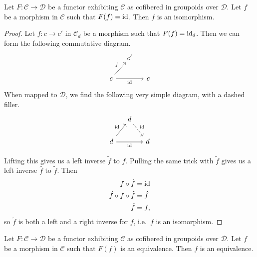 \documentclass[main.tex]{subfiles}
\begin{document}
\begin{lemma}
  \label{lemma:cofibered_in_groupoids_morphism_mapped_to_identity_is_isomorphism}
  Let $F\colon \mathcal{C} \to \mathcal{D}$ be a functor exhibiting $\mathcal{C}$ as cofibered in groupoids over $\mathcal{D}$. Let $f$ be a morphism in $\mathcal{C}$ such that $F(f) = \mathrm{id}$. Then $f$ is an isomorphism.
\end{lemma}
\begin{proof}
  Let $f\colon c \to c'$ in $\mathcal{C}_{d}$ be a morphism such that $F(f) = \mathrm{id}_{d}$. Then we can form the following commutative diagram.
  \begin{equation*}
    \begin{tikzcd}[column sep=small]
      & c'
      \\
      c
      \arrow[ur, "f"]
      \arrow[rr, swap, "\id"]
      & & c
    \end{tikzcd}
  \end{equation*}
  When mapped to $\mathcal{D}$, we find the following very simple diagram, with a dashed filler.
  \begin{equation*}
    \begin{tikzcd}[column sep=small]
      & d
      \arrow[dr, dashed, "\id"]
      \\
      d
      \arrow[ur, "\id"]
      \arrow[rr, swap, "\id"]
      && d
    \end{tikzcd}
  \end{equation*}

  Lifting this gives us a left inverse $\tilde{f}$ to $f$. Pulling the same trick with $\tilde{f}$ gives us a left inverse $\hat{f}$ to $\tilde{f}$. Then
  \begin{align*}
    f \circ \tilde{f} &= \mathrm{id} \\
    \hat{f} \circ f \circ \tilde{f} &= \hat{f} \\
    \hat{f} &= f,
  \end{align*}
  so $\tilde{f}$ is both a left and a right inverse for $f$, i.e.\ $f$ is an isomorphism.
\end{proof}

\begin{lemma}
  \label{lemma:cofibered_in_groupoids_morphism_mapped_to_equivalence_is_equivalence}
  Let $F\colon \mathcal{C} \to \mathcal{D}$ be a functor exhibiting $\mathcal{C}$ as cofibered in groupoids over $\mathcal{D}$. Let $f$ be a morphism in $\mathcal{C}$ such that $F(f)$ is an equivalence. Then $f$ is an equivalence.
\end{lemma}
\end{document}
